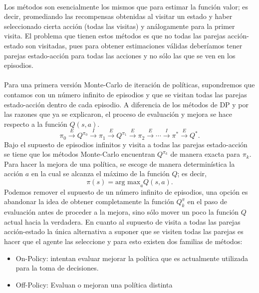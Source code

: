 \documentclass[11pt]{article}
\theoremstyle{plain}
\begin{document}
\\
Los métodos son esencialmente los mismos que para estimar la función valor; es decir, promediando las recompensas obtenidas al visitar un estado y haber seleccionado cierta acción (todas las visitas) y análogamente para la primer visita. El problema que tienen estos métodos es que no todas las parejas acción-estado son visitadas, pues para obtener estimaciones válidas deberíamos tener parejas estado-acción para todas las acciones y no sólo las que se ven en los episodios.\\
\\
Para una primera versión Monte-Carlo de iteración de políticas, supondremos que contamos con un número infinito de episodios y que se visitan todas las parejas estado-acción dentro de cada episodio. A diferencia de los métodos de DP y por las razones que ya se explicaron, el proceso de evaluación y mejora se hace respecto a la función $Q(s,a)$.
\[ \pi_0 \xrightarrow{E} Q^{\pi_0} \xrightarrow{I} \pi_1 \xrightarrow{E} Q^{\pi_1} \xrightarrow{E} \pi_2 \xrightarrow{E} \cdots \xrightarrow{I} \pi^\ast \xrightarrow{E} Q^\ast.  \]
Bajo el supuesto de episodios infinitos y visita a todas las parejas estado-acción se tiene que los métodos Monte-Carlo encuentran $Q^{\pi_k}$ de manera exacta para $\pi_k$.\\
Para hacer la mejora de una política, se escoge de manera determinística la acción $a$ en la cual se alcanza el máximo de la función $Q$; es decir,
\[ \pi(s) = \textrm{arg max}_a Q(s,a).\]
Podemos remover el supuesto de un número infinito de episodios, una opción es abandonar la idea de obtener completamente la función $Q^\pi_k$ en el paso de evaluación antes de proceder a la mejora, sino sólo mover un poco la función $Q$ actual hacia la verdadera. En cuanto al supuesto de visita a todas las parejas acción-estado la única alternativa a suponer que se visiten todas las parejas es hacer que el agente las seleccione y para esto existen dos familias de métodos:
		\begin{itemize}
				\item On-Policy: intentan evaluar mejorar la política que es actualmente utilizada para la toma de decisiones.
				\item Off-Policy: Evaluan o mejoran una política distinta
		\end{itemize}
\end{document}

